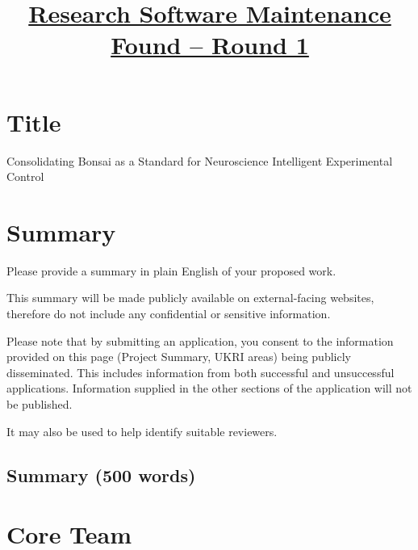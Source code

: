 \documentclass[12pt]{article}
\title{\href{https://www.software.ac.uk/research-software-maintenance-fund/round-1}{Research
Software Maintenance Found -- Round 1}}
\author{}
\newenvironment{instruction}{%
    \begin{tcolorbox}[colback=red!5,colframe=red,title=Instruction]%
}{%
    \end{tcolorbox}%
}
\begin{document}
\maketitle

\section*{Title}

Consolidating Bonsai as a Standard for Neuroscience Intelligent Experimental Control

\tableofcontents

\pagebreak

\section{Summary}

\begin{instruction}

Please provide a summary in plain English of your proposed work.

This summary will be made publicly available on external-facing websites, therefore do not include any confidential or sensitive information.

Please note that by submitting an application, you consent to the information provided on this page (Project Summary, UKRI areas) being publicly disseminated. This includes information from both successful and unsuccessful applications. Information supplied in the other sections of the application will not be published.

It may also be used to help identify suitable reviewers.

\end{instruction}

\subsection{Summary (500 words)}



\pagebreak

\section{Core Team}
\end{document}

